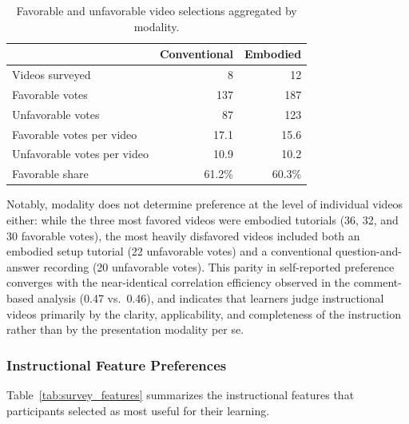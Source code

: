 \documentclass[fleqn,10pt]{JLA_article} %
\begin{document}
\begin{table}[h!]
    \centering
    \caption{Favorable and unfavorable video selections aggregated by modality.}
    \begin{tabular}{l r r}
        \toprule
        & \textbf{Conventional} & \textbf{Embodied} \\
        \midrule
        Videos surveyed & 8 & 12 \\
        Favorable votes & 137 & 187 \\
        Unfavorable votes & 87 & 123 \\
        Favorable votes per video & 17.1 & 15.6 \\
        Unfavorable votes per video & 10.9 & 10.2 \\
        Favorable share & 61.2\% & 60.3\% \\
        \bottomrule
    \end{tabular}
    \label{tab:survey_votes}
\end{table}

Notably, modality does not determine preference at the level of individual videos either: while the three most favored videos were embodied tutorials (36, 32, and 30 favorable votes), the most heavily disfavored videos included both an embodied setup tutorial (22 unfavorable votes) and a conventional question-and-answer recording (20 unfavorable votes). This parity in self-reported preference converges with the near-identical correlation efficiency observed in the comment-based analysis (0.47 vs.\ 0.46), and indicates that learners judge instructional videos primarily by the clarity, applicability, and completeness of the instruction rather than by the presentation modality per se.

\subsubsection{Instructional Feature Preferences}
Table~\ref{tab:survey_features} summarizes the instructional features that participants selected as most useful for their learning.
\end{document}
